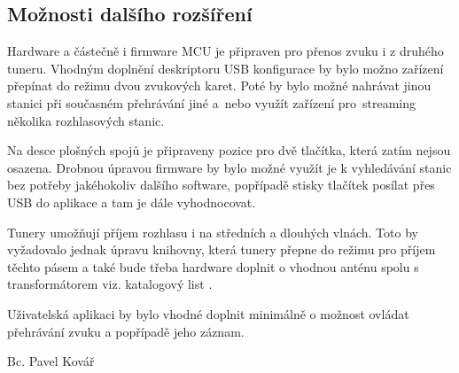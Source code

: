 


\FloatBarrier
\subsection{Možnosti dalšího rozšíření}
Hardware a částečně i firmware MCU je připraven pro přenos zvuku i z druhého tuneru. Vhodným doplnění deskriptoru USB konfigurace by bylo možno zařízení přepínat do režimu dvou zvukových karet. Poté by bylo možné nahrávat jinou stanici při současném přehrávání jiné a~nebo využít zařízení pro~streaming několika rozhlasových stanic.  

Na desce plošných spojů je připraveny pozice pro dvě tlačítka, která zatím nejsou osazena. Drobnou úpravou firmware by bylo možné využít je k vyhledávání stanic bez potřeby jakéhokoliv dalšího software, popřípadě stisky tlačítek posílat přes USB do aplikace a tam je dále vyhodnocovat.

Tunery umožňují příjem rozhlasu i na středních a dlouhých vlnách. Toto by vyžadovalo jednak úpravu knihovny, která tunery přepne do režimu pro příjem těchto pásem a také bude třeba hardware doplnit o vhodnou anténu spolu s transformátorem viz. katalogový list \cite{tuner-datasheet}.

Uživatelská aplikaci by bylo vhodné doplnit minimálně o možnost ovládat přehrávání zvuku a popřípadě jeho záznam.





\bigskip
\begin{flushright}
Bc. Pavel Kovář
\end{flushright}